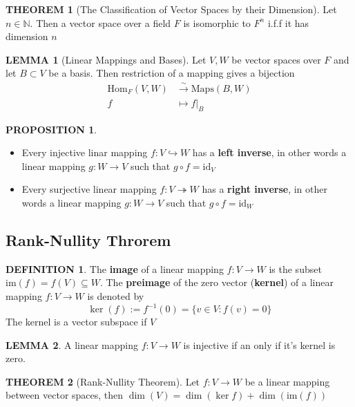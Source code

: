 \documentclass[12pt]{article}
\theoremstyle{definition}
\newtheorem{definition}{DEFINITION}[subsection]
\newtheorem{theorem}{THEOREM}[subsection]
\newcommand{\Hom}{\text{Hom}}
\newcommand{\Maps}{\text{Maps}}
\newcommand{\image}{\text{im}}
\newtheorem{lemma}{LEMMA}[subsection]
\newtheorem{prop}{PROPOSITION}[subsection]
\begin{document}
\begin{theorem}[The Classification of Vector Spaces by their Dimension]
    Let $n\in \mathbb{N}$. Then a vector space over a field $F$ is isomorphic to $F^n$ i.f.f it has dimension $n$
\end{theorem}

\begin{lemma}[Linear Mappings and Bases]
    Let $V,W$ be vector spaces over $F$ and let $B \subset V$ be a basis. Then restriction of a mapping gives a bijection
    \[\begin{split}
        \Hom_F(V,W) &\stackrel{\sim}{\rightarrow} \Maps(B,W)\\
        f &\mapsto f|_B
    \end{split}\]
\end{lemma}

\begin{prop}
    \begin{itemize}
        \item Every injective linar mapping $f:V \hookrightarrow W$ has a \textbf{left inverse}, in other words a linear mapping $g: W \rightarrow V$ such that $g \circ f = \text{id}_V$
        \item Every surjective linear mapping $f:V \twoheadrightarrow W$ has a \textbf{right inverse}, in other words a linear mapping $g: W \rightarrow V$ such that $g \circ f = \text{id}_W$
    \end{itemize}
\end{prop}

\subsection{Rank-Nullity Throrem}
\begin{definition}
    The \textbf{image} of a linear mapping $f: V \rightarrow W$ is the subset $\image(f) = f(V) \subseteq W$. The \textbf{preimage} of the zero vector (\textbf{kernel}) of a linear mapping $f: V \rightarrow W$ is denoted by $$\ker(f) := f^{-1}(0) = \{v \in V: f(v) = 0\}$$
    The kernel is a vector subspace if $V$
\end{definition}

\begin{lemma}
    A linear mapping $f: V \rightarrow W$ is injective if an only if it's kernel is zero.
\end{lemma}

\begin{theorem}[Rank-Nullity Theorem]
    Let $f: V \rightarrow W$ be a linear mapping between vector spaces, then $\dim(V) = \dim(\ker{f}) + \dim(\image(f))$
\end{theorem}
\end{document}
